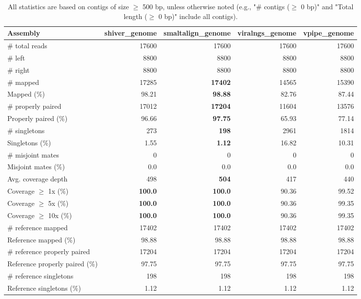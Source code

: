 \documentclass[12pt,a4paper]{article}
\begin{document}
\begin{table}[ht]
\begin{center}
\caption{All statistics are based on contigs of size $\geq$ 500 bp, unless otherwise noted (e.g., "\# contigs ($\geq$ 0 bp)" and "Total length ($\geq$ 0 bp)" include all contigs).}
\begin{tabular}{|l*{4}{|r}|}
\hline
Assembly & shiver\_genome & smaltalign\_genome & viralngs\_genome & vpipe\_genome \\ \hline
\# total reads & 17600 & 17600 & 17600 & 17600 \\ \hline
\# left & 8800 & 8800 & 8800 & 8800 \\ \hline
\# right & 8800 & 8800 & 8800 & 8800 \\ \hline
\# mapped & 17285 & {\bf 17402} & 14565 & 15390 \\ \hline
Mapped (\%) & 98.21 & {\bf 98.88} & 82.76 & 87.44 \\ \hline
\# properly paired & 17012 & {\bf 17204} & 11604 & 13576 \\ \hline
Properly paired (\%) & 96.66 & {\bf 97.75} & 65.93 & 77.14 \\ \hline
\# singletons & 273 & {\bf 198} & 2961 & 1814 \\ \hline
Singletons (\%) & 1.55 & {\bf 1.12} & 16.82 & 10.31 \\ \hline
\# misjoint mates & 0 & 0 & 0 & 0 \\ \hline
Misjoint mates (\%) & 0.0 & 0.0 & 0.0 & 0.0 \\ \hline
Avg. coverage depth & 498 & {\bf 504} & 417 & 440 \\ \hline
Coverage $\geq$ 1x (\%) & {\bf 100.0} & {\bf 100.0} & 90.36 & 99.52 \\ \hline
Coverage $\geq$ 5x (\%) & {\bf 100.0} & {\bf 100.0} & 90.36 & 99.35 \\ \hline
Coverage $\geq$ 10x (\%) & {\bf 100.0} & {\bf 100.0} & 90.36 & 99.35 \\ \hline
\# reference mapped & 17402 & 17402 & 17402 & 17402 \\ \hline
Reference mapped (\%) & 98.88 & 98.88 & 98.88 & 98.88 \\ \hline
\# reference properly paired & 17204 & 17204 & 17204 & 17204 \\ \hline
Reference properly paired (\%) & 97.75 & 97.75 & 97.75 & 97.75 \\ \hline
\# reference singletons & 198 & 198 & 198 & 198 \\ \hline
Reference singletons (\%) & 1.12 & 1.12 & 1.12 & 1.12 \\ \hline

\end{tabular}
\end{center}
\end{table}
\end{document}
